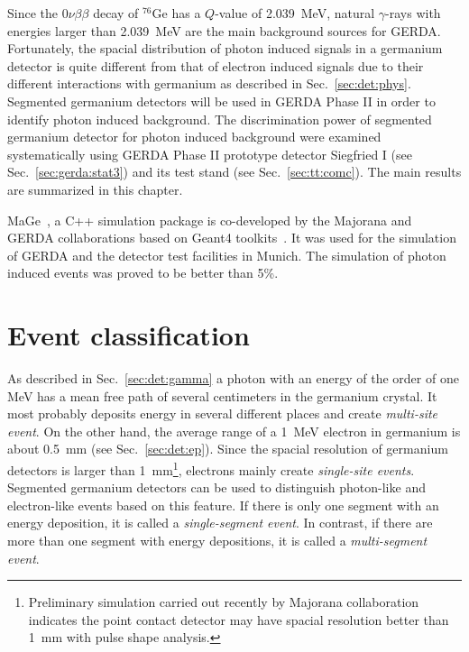 Since the $0\nu\beta\beta$ decay of $^{76}$Ge has a $Q$-value of 2.039~MeV, natural $\gamma$-rays with energies larger than 2.039~MeV are the main background sources for GERDA. Fortunately, the spacial distribution of photon induced signals in a germanium detector is quite different from that of electron induced signals due to their different interactions with germanium as described in Sec.~\ref{sec:det:phys}. Segmented germanium detectors will be used in GERDA Phase II in order to identify photon induced background. The discrimination power of segmented germanium detector for photon induced background were examined systematically\cite{Pid07} using GERDA Phase II prototype detector Siegfried I (see Sec.~\ref{sec:gerda:stat3}) and its test stand (see Sec.~\ref{sec:tt:comc}). The main results are summarized in this chapter. 

MaGe~\cite{Mag08}, a C++ simulation package is co-developed by the Majorana and GERDA collaborations based on Geant4 toolkits~\cite{Gea03,Gea06}. It was used for the simulation of GERDA and the detector test facilities in Munich. The simulation of photon induced events was proved to be better than 5\%.

\section{Event classification}
\label{sec:ph:eve}
As described in Sec.~\ref{sec:det:gamma} a photon with an energy of the order of one MeV has a mean free path of several centimeters in the germanium crystal. It most probably deposits energy in several different places and create \emph{multi-site event}. On the other hand, the average range of a 1~MeV electron in germanium is about 0.5~mm (see Sec.~\ref{sec:det:ep}). Since the spacial resolution of germanium detectors is larger than 1~mm\footnote{Preliminary simulation carried out recently by Majorana collaboration indicates the point contact detector may have spacial resolution better than 1~mm with pulse shape analysis.}, electrons mainly create \emph{single-site events}. Segmented germanium detectors can be used to distinguish photon-like and electron-like events based on this feature. If there is only one segment with an energy deposition, it is called a \emph{single-segment event}. In contrast, if there are more than one segment with energy depositions, it is called a \emph{multi-segment event}. 

